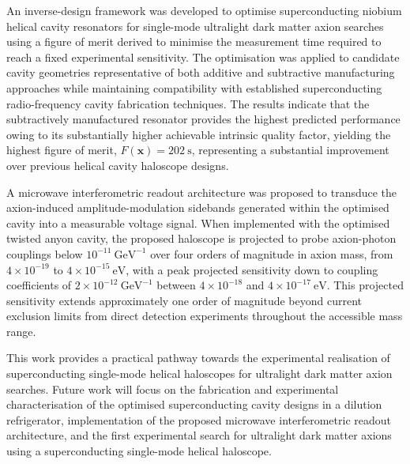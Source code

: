 \documentclass[
  aps,
  physrev,
  reprint,
  superscriptaddress,
  nofootinbib,
  amsmath,
  amssymb
]{revtex4-2}
\begin{document}
An inverse-design framework was developed to optimise superconducting niobium helical cavity resonators for single-mode ultralight dark matter axion searches using a figure of merit derived to minimise the measurement time required to reach a fixed experimental sensitivity. The optimisation was applied to candidate cavity geometries representative of both additive and subtractive manufacturing approaches while maintaining compatibility with established superconducting radio-frequency cavity fabrication techniques. The results indicate that the subtractively manufactured resonator provides the highest predicted performance owing to its substantially higher achievable intrinsic quality factor, yielding the highest figure of merit, $F(\mathbf{x})=202~\mathrm{s}$, representing a substantial improvement over previous helical cavity haloscope designs. 

A microwave interferometric readout architecture was proposed to transduce the axion-induced amplitude-modulation sidebands generated within the optimised cavity into a measurable voltage signal. When implemented with the optimised twisted anyon cavity, the proposed haloscope is projected to probe axion-photon couplings below $10^{-11}~\mathrm{GeV}^{-1}$ over four orders of magnitude in axion mass, from $4\times10^{-19}$ to $4\times10^{-15}~\mathrm{eV}$, with a peak projected sensitivity down to coupling coefficients of $2\times10^{-12}~\mathrm{GeV}^{-1}$ between $4\times10^{-18}$ and $4\times10^{-17}~\mathrm{eV}$. This projected sensitivity extends approximately one order of magnitude beyond current exclusion limits from direct detection experiments throughout the accessible mass range.

This work provides a practical pathway towards the experimental realisation of superconducting single-mode helical haloscopes for ultralight dark matter axion searches. Future work will focus on the fabrication and experimental characterisation of the optimised superconducting cavity designs in a dilution refrigerator, implementation of the proposed microwave interferometric readout architecture, and the first experimental search for ultralight dark matter axions using a superconducting single-mode helical haloscope.










\vspace{6pt} 
\end{document}
